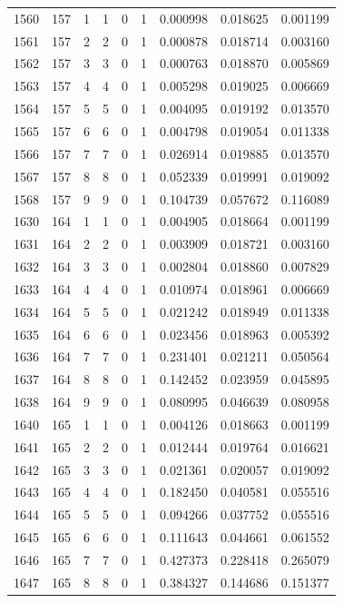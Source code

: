 \begin{longtable}{rrrrrrrrr}
1560 & 157 & 1 & 1 & 0 & 1 & 0.000998 & 0.018625 & 0.001199 \\
1561 & 157 & 2 & 2 & 0 & 1 & 0.000878 & 0.018714 & 0.003160 \\
1562 & 157 & 3 & 3 & 0 & 1 & 0.000763 & 0.018870 & 0.005869 \\
1563 & 157 & 4 & 4 & 0 & 1 & 0.005298 & 0.019025 & 0.006669 \\
1564 & 157 & 5 & 5 & 0 & 1 & 0.004095 & 0.019192 & 0.013570 \\
1565 & 157 & 6 & 6 & 0 & 1 & 0.004798 & 0.019054 & 0.011338 \\
1566 & 157 & 7 & 7 & 0 & 1 & 0.026914 & 0.019885 & 0.013570 \\
1567 & 157 & 8 & 8 & 0 & 1 & 0.052339 & 0.019991 & 0.019092 \\
1568 & 157 & 9 & 9 & 0 & 1 & 0.104739 & 0.057672 & 0.116089 \\
1630 & 164 & 1 & 1 & 0 & 1 & 0.004905 & 0.018664 & 0.001199 \\
1631 & 164 & 2 & 2 & 0 & 1 & 0.003909 & 0.018721 & 0.003160 \\
1632 & 164 & 3 & 3 & 0 & 1 & 0.002804 & 0.018860 & 0.007829 \\
1633 & 164 & 4 & 4 & 0 & 1 & 0.010974 & 0.018961 & 0.006669 \\
1634 & 164 & 5 & 5 & 0 & 1 & 0.021242 & 0.018949 & 0.011338 \\
1635 & 164 & 6 & 6 & 0 & 1 & 0.023456 & 0.018963 & 0.005392 \\
1636 & 164 & 7 & 7 & 0 & 1 & 0.231401 & 0.021211 & 0.050564 \\
1637 & 164 & 8 & 8 & 0 & 1 & 0.142452 & 0.023959 & 0.045895 \\
1638 & 164 & 9 & 9 & 0 & 1 & 0.080995 & 0.046639 & 0.080958 \\
1640 & 165 & 1 & 1 & 0 & 1 & 0.004126 & 0.018663 & 0.001199 \\
1641 & 165 & 2 & 2 & 0 & 1 & 0.012444 & 0.019764 & 0.016621 \\
1642 & 165 & 3 & 3 & 0 & 1 & 0.021361 & 0.020057 & 0.019092 \\
1643 & 165 & 4 & 4 & 0 & 1 & 0.182450 & 0.040581 & 0.055516 \\
1644 & 165 & 5 & 5 & 0 & 1 & 0.094266 & 0.037752 & 0.055516 \\
1645 & 165 & 6 & 6 & 0 & 1 & 0.111643 & 0.044661 & 0.061552 \\
1646 & 165 & 7 & 7 & 0 & 1 & 0.427373 & 0.228418 & 0.265079 \\
1647 & 165 & 8 & 8 & 0 & 1 & 0.384327 & 0.144686 & 0.151377 \\

\end{longtable}
